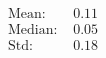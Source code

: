 \documentclass[preview]{standalone}
\begin{document}
\begin{align*}
\text{Mean: } &0.11\\\text{Median: } &0.05\\\text{Std: } &0.18
\end{align*}
\end{document}
